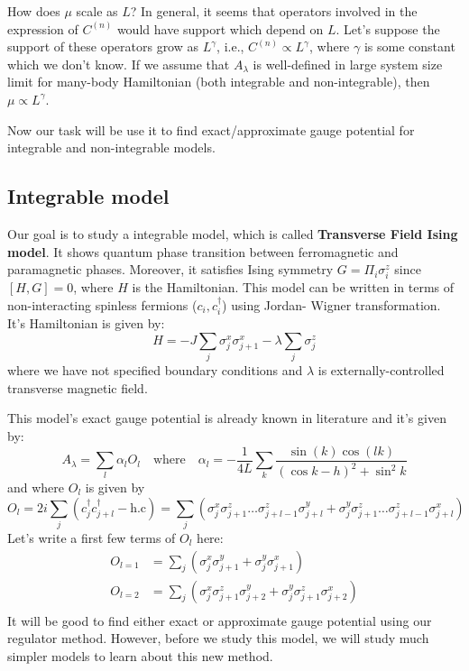 \documentclass[11pt,a4paper]{article}
\begin{document}
How does $\mu$ scale as $L$? In general, it seems that operators involved in the expression of $C^{(n)}$ would have support which depend on $L$. Let's suppose the support of these operators grow as $L^{\gamma}$, i.e., $C^{(n)} \propto L^{\gamma}$, where $\gamma$ is some constant which we don't know. If we assume that $ A_{\lambda}$ is well-defined in large system size limit for many-body Hamiltonian (both integrable and non-integrable), then  $\mu \propto L^{\gamma}$.

Now our task will be use it to find exact/approximate gauge potential for integrable and non-integrable models.

\subsection{Integrable model}
Our goal is to study a integrable model, which is called \textbf{Transverse Field Ising model}. It shows quantum phase transition between ferromagnetic and paramagnetic phases. Moreover, it satisfies Ising symmetry $G= \Pi_i \sigma_i^z$ since $[H, G]=0$, where $H$ is the Hamiltonian.
This model can be written in terms of non-interacting spinless fermions ($c_i, c^{\dagger}_i $) using Jordan- Wigner transformation. It's Hamiltonian is given by:
\begin{equation}
H= -J \sum_{j} \sigma_j^x \sigma_{j+1}^x - \lambda \sum_{j} \sigma_j^z 
\label{xx_z}
\end{equation}
where we have not specified boundary conditions and $\lambda$ is externally-controlled transverse magnetic field.

This model's exact gauge potential is already known in literature \cite{del2012assisted, kolodrubetz2016geometry} and it's given by:
\begin{equation}
A_{\lambda}= \sum_l \alpha_l O_l \quad \mbox{where} \quad \alpha_l= -\dfrac{1}{4 L} \sum_k \dfrac{\sin(k) \cos(lk)}{(\cos k - h)^2 + \sin^2 k}
\end{equation}
and where  $O_l$ is given by
\begin{equation}
O_l= 2 i \sum_j (c^{\dagger}_{j} c^{\dagger}_{j+l} - \mbox{h.c})= \sum_j ( \sigma_j^x \sigma_{j+1}^z \ldots \sigma_{j+l-1}^z \sigma_{j+l}^y +  \sigma_j^y \sigma_{j+1}^z \ldots \sigma_{j+l-1}^z \sigma_{j+l}^x)
\end{equation}
Let's write a first few terms of $O_l$ here:
\begin{align*}
O_{l=1}&=  \sum_j ( \sigma_j^x  \sigma_{j+1}^y +  \sigma_j^y  \sigma_{j+1}^x) \\
O_{l=2} &=  \sum_j ( \sigma_j^x \sigma_{j+1}^z \sigma_{j+2}^y +  \sigma_j^y \sigma_{j+1}^z \sigma_{j+2}^x) \\
\end{align*}
It will be good to find either exact or approximate gauge potential using our regulator method. However, before we study this model, we will study much simpler models to learn about this new method.
\end{document}
